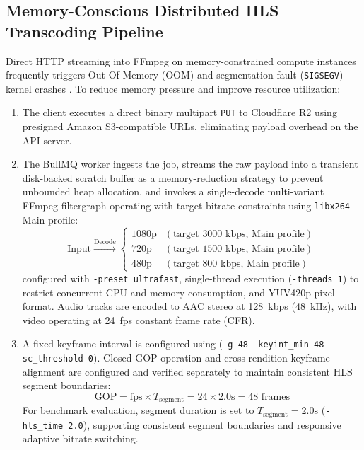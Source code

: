 \documentclass[conference]{IEEEtran}
\begin{document}
\subsection{Memory-Conscious Distributed HLS Transcoding Pipeline}
Direct HTTP streaming into FFmpeg on memory-constrained compute instances frequently triggers Out-Of-Memory (OOM) and segmentation fault (\texttt{SIGSEGV}) kernel crashes \cite{b10}. To reduce memory pressure and improve resource utilization:
\begin{enumerate}
    \item The client executes a direct binary multipart \texttt{PUT} to Cloudflare R2 using presigned Amazon S3-compatible URLs, eliminating payload overhead on the API server.
    \item The BullMQ worker ingests the job, streams the raw payload into a transient disk-backed scratch buffer as a memory-reduction strategy to prevent unbounded heap allocation, and invokes a single-decode multi-variant FFmpeg filtergraph operating with target bitrate constraints using \texttt{libx264} Main profile:
    \begin{equation}
    \text{Input} \xrightarrow{\text{Decode}} \begin{cases} 
    1080\text{p} & (\text{target } 3000\text{ kbps}, \, \text{Main profile}) \\ 
    720\text{p} & (\text{target } 1500\text{ kbps}, \, \text{Main profile}) \\ 
    480\text{p} & (\text{target } 800\text{ kbps}, \, \text{Main profile}) 
    \end{cases}
    \label{eq:filtergraph}
    \end{equation}
    configured with \texttt{-preset ultrafast}, single-thread execution (\texttt{-threads 1}) to restrict concurrent CPU and memory consumption, and YUV420p pixel format. Audio tracks are encoded to AAC stereo at 128~kbps (48~kHz), with video operating at 24~fps constant frame rate (CFR).
    \item A fixed keyframe interval is configured using (\texttt{-g 48 -keyint\_min 48 -sc\_threshold 0}). Closed-GOP operation and cross-rendition keyframe alignment are configured and verified separately to maintain consistent HLS segment boundaries:
    \begin{equation}
    \text{GOP} = \text{fps} \times T_{\text{segment}} = 24 \times 2.0\text{s} = 48 \text{ frames}
    \label{eq:gop}
    \end{equation}
    For benchmark evaluation, segment duration is set to $T_{\text{segment}} = 2.0\text{s}$ (\texttt{-hls\_time 2.0}), supporting consistent segment boundaries and responsive adaptive bitrate switching.
\end{enumerate}
\end{document}
